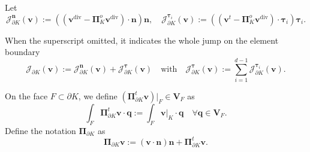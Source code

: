 \documentclass[review,hidelinks,onefignum,onetabnum]{siamart251216}
\begin{document}
{}

Let
\[
\mathcal{J}_{\partial K}^{\boldsymbol{n}}(\boldsymbol{v}) := ((\boldsymbol{v}^{\operatorname{div}} - \boldsymbol{\Pi}_K^o \boldsymbol{v}^{\operatorname{div}}) \cdot \boldsymbol{n})\boldsymbol{n}, \quad \mathcal{J}_{\partial K}^{\boldsymbol{\tau}_i}(\boldsymbol{v}) := ((\boldsymbol{v}^t - \boldsymbol{\Pi}_K^o \boldsymbol{v}^{\operatorname{div}}) \cdot \boldsymbol{\tau}_i)\boldsymbol{\tau}_i.
\]

When the superscript omitted, it indicates the whole jump on the element boundary
\[
\mathcal{J}_{\partial K}(\boldsymbol{v}) := \mathcal{J}_{\partial K}^{\boldsymbol{n}}(\boldsymbol{v}) + \mathcal{J}_{\partial K}^{\boldsymbol{\tau}}(\boldsymbol{v}) \quad \text{with} \quad \mathcal{J}_{\partial K}^{\boldsymbol{\tau}}(\boldsymbol{v}) := \sum_{i=1}^{d-1} \mathcal{J}_{\partial K}^{\boldsymbol{\tau}_i}(\boldsymbol{v}).
\]

 On the face \(F \subset \partial K\), we define \((\boldsymbol{\Pi}_{\partial K}^t \boldsymbol{v})|_F \in \boldsymbol{V}_F\) as
\[
\int_F \boldsymbol{\Pi}_{\partial K}^t \boldsymbol{v} \cdot \boldsymbol{q} := \int_F \boldsymbol{v}|_K \cdot \boldsymbol{q} \quad \forall \boldsymbol{q} \in \boldsymbol{V}_F.
\]
Define the notation \(\boldsymbol{\Pi}_{\partial K}\) as
\[
\boldsymbol{\Pi}_{\partial K} \boldsymbol{v} := (\boldsymbol{v} \cdot \boldsymbol{n})\boldsymbol{n} + \boldsymbol{\Pi}_{\partial K}^t \boldsymbol{v}.
\]
\end{document}
